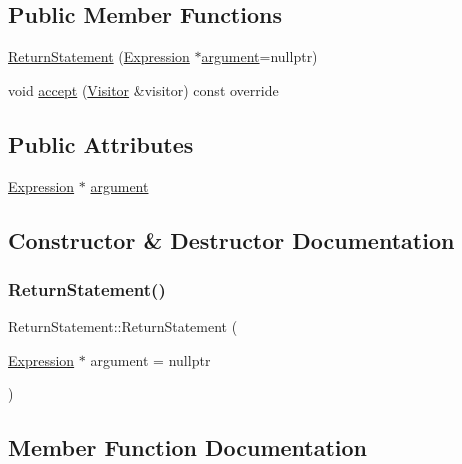 \subsection*{Public Member Functions}
\begin{DoxyCompactItemize}
\item 
\hyperlink{struct_return_statement_ac2932e3a360cb4399de2f6235e64081a}{Return\+Statement} (\hyperlink{struct_expression}{Expression} $\ast$\hyperlink{struct_return_statement_aeead2cb2bcecfed685d54bb7ee5456f2}{argument}=nullptr)
\item 
void \hyperlink{struct_return_statement_af266bfb192300eeffc2d7454b019dd1a}{accept} (\hyperlink{struct_visitor}{Visitor} \&visitor) const override
\end{DoxyCompactItemize}
\subsection*{Public Attributes}
\begin{DoxyCompactItemize}
\item 
\hyperlink{struct_expression}{Expression} $\ast$ \hyperlink{struct_return_statement_aeead2cb2bcecfed685d54bb7ee5456f2}{argument}
\end{DoxyCompactItemize}


\subsection{Constructor \& Destructor Documentation}
\mbox{\label{struct_return_statement_ac2932e3a360cb4399de2f6235e64081a}} 
\subsubsection{\texorpdfstring{Return\+Statement()}{ReturnStatement()}}
{\footnotesize\ttfamily Return\+Statement\+::\+Return\+Statement (\begin{DoxyParamCaption}\item[{\hyperlink{struct_expression}{Expression} $\ast$}]{argument = {\ttfamily nullptr} }\end{DoxyParamCaption})\hspace{0.3cm}{\ttfamily [inline]}}



\subsection{Member Function Documentation}
\mbox{\label{struct_return_statement_af266bfb192300eeffc2d7454b019dd1a}} 
